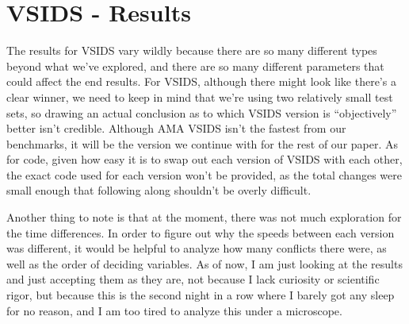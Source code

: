 \section{VSIDS - Results}
The results for VSIDS vary wildly because there are so many different types beyond what 
we've explored, and there are so many different parameters that could affect the end 
results. For VSIDS, although there might look like there's a clear winner, we need to 
keep in mind that we're using two relatively small test sets, so drawing an actual
conclusion as to which VSIDS version is ``objectively'' better isn't credible. 
Although AMA VSIDS isn't the fastest from our benchmarks, it will be the version we 
continue with for the rest of our paper. As for code, given how easy it is to swap out 
each version of VSIDS with each other, the exact code used for each version won't be 
provided, as the total changes were small enough that following along shouldn't be overly
difficult.

Another thing to note is that at the moment, there was not much exploration for the 
time differences. In order to figure out why the speeds between each version was 
different, it would be helpful to analyze how many conflicts there were, as well as the
order of deciding variables. As of now, I am just looking at the results and just 
accepting them as they are, not because I lack curiosity or scientific rigor, but because 
this is the second night in a row where I barely got any sleep for no reason, and I 
am too tired to analyze this under a microscope.

